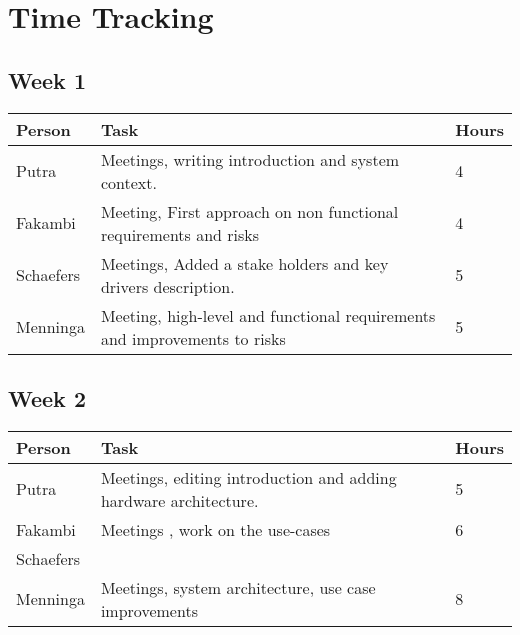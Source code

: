 \chapter{Time Tracking}
\label{App: Time Tracking}

\section*{Week 1}


\begin{longtable}{p{} p{} p{}}
	\textbf{Person} & \textbf{Task} & \textbf{Hours} \\ \toprule
	Putra           & Meetings, writing introduction and system context.	& 4	\\ \midrule
	Fakambi         & Meeting, First approach on non functional requirements and risks & 4 \\ \midrule
	Schaefers       & Meetings, Added a stake holders and key drivers description.	& 	5 \\ \midrule
	Menninga        & Meeting, high-level and functional requirements and improvements to risks	&	5\\ \bottomrule
\end{longtable}

\section*{Week 2}

\begin{longtable}{p{} p{} p{}}
	\textbf{Person} & \textbf{Task} & \textbf{Hours} \\ \toprule
	Putra           & Meetings, editing introduction and adding hardware architecture.	& 5	\\ \midrule
	Fakambi         & Meetings , work on the use-cases & 6 \\ \midrule
	Schaefers       & & \\ \midrule
	Menninga        & Meetings, system architecture, use case improvements & 8 \\ \bottomrule
\end{longtable}

